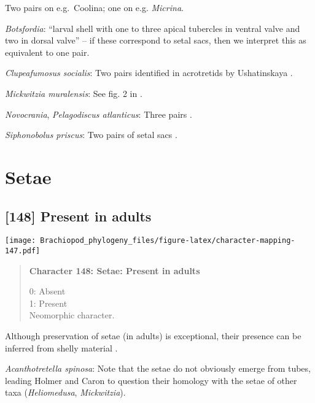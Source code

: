 \documentclass[openany]{book}
\theoremstyle{definition}
\theoremstyle{definition}
\theoremstyle{definition}
\theoremstyle{remark}
\begin{document}
Two pairs on e.g.~Coolina; one on e.g. \emph{Micrina}.

\hypertarget{Botsfordia-coding-147}{}
\emph{Botsfordia}: ``larval shell with one to three apical tubercles in
ventral valve and two in dorsal valve''
\citep{Williams2000LinguliformeaCraniiformea} -- if these correspond to
setal sacs, then we interpret this as equivalent to one pair.

\hypertarget{Clupeafumosus_socialis-coding-147}{}
\emph{Clupeafumosus socialis}: Two pairs identified in acrotretids by
Ushatinskaya \citeyearpar{Ushatinskaya2016Protegulumand}.

\hypertarget{Mickwitzia_muralensis-coding-147}{}
\emph{Mickwitzia muralensis}: See fig. 2 in
\citet{Balthasar2009Thebrachiopod}.

\hypertarget{Novocrania-coding-147}{}
\emph{Novocrania}, \emph{Pelagodiscus atlanticus}: Three pairs
\citep{Carlson1995Phylogeneticrelationships}.

\hypertarget{Siphonobolus_priscus-coding-147}{}
\emph{Siphonobolus priscus}: Two pairs of setal sacs
\citep{Popov2009Earlyontogeny}.

\section{Setae}\label{setae}

\subsection*{{[}148{]} Present in adults}\label{present-in-adults}

\texttt{[image: Brachiopod\_phylogeny\_files/figure-latex/character-mapping-147.pdf]}

\begin{quote}
\textbf{Character 148: Setae: Present in adults}

0: Absent\\
1: Present\\
Neomorphic character.
\end{quote}

Although preservation of setae (in adults) is exceptional, their
presence can be inferred from shelly material
\citep[see][]{Holmer2006Aspinose}.

\hypertarget{Acanthotretella_spinosa-coding-148}{}
\emph{Acanthotretella spinosa}: Note that the setae do not obviously
emerge from tubes, leading Holmer and Caron to question their homology
with the setae of other taxa (\emph{Heliomedusa}, \emph{Mickwitzia}).
\end{document}

